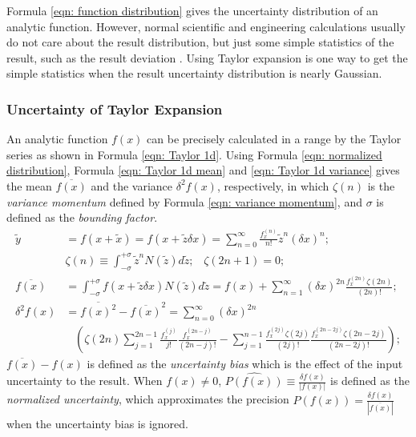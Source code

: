 \documentclass[twoside]{article}
\numberwithin{equation}{section}
\newcommand{\eqspace}{\;\;\;}
\begin{document}
\fi


Formula \eqref{eqn: function distribution} gives the uncertainty distribution of an analytic function.
However, normal scientific and engineering calculations usually do not care about the result distribution, but just some simple statistics of the result, such as the result deviation \cite{Statistical_Methods} \cite{Precisions_Physical_Measurements}.
Using Taylor expansion is one way to get the simple statistics when the result uncertainty distribution is nearly Gaussian.

\subsubsection{Uncertainty of Taylor Expansion}

An analytic function $f(x)$ can be precisely calculated in a range by the Taylor series as shown in Formula \eqref{eqn: Taylor 1d}.
Using Formula \eqref{eqn: normalized distribution}, Formula \eqref{eqn: Taylor 1d mean} and \eqref{eqn: Taylor 1d variance} \cite{Prev_Precision_Arithmetic} gives the mean $\overline{f(x)}$ and the variance $\delta^2 f(x)$, respectively, in which $\zeta(n)$ is the \emph{variance momentum} defined by Formula \eqref{eqn: variance momentum}, and $\sigma$ is defined as the \emph{bounding factor}.
\begin{align}
\label{eqn: Taylor 1d} 
\tilde{y} &= f(x + \tilde{x}) = f(x + \tilde{z} \delta x) = \sum_{n=0}^{\infty} \frac{f^{(n)}_x}{n!} \tilde{z}^n (\delta x)^n; \\
\label{eqn: variance momentum}
& \zeta(n) \equiv \int_{-\sigma}^{+\sigma} \tilde{z}^n N(\tilde{z}) d \tilde{z};\eqspace \zeta(2n+1) = 0; \\
\label{eqn: Taylor 1d mean}
\overline{f(x)} &= \int_{-\sigma}^{+\sigma} f(x + \tilde{z} \delta x) N(\tilde{z}) d \tilde{z}
  = f(x) + \sum_{n=1}^{\infty}(\delta x)^{2n} \frac{f^{(2n)}_x \zeta(2n)}{(2n)!}; \\
\label{eqn: Taylor 1d variance}
\delta^2 f(x) &= \overline{f(x)^2} - \overline{f(x)}^2 = \sum_{n=0}^{\infty} (\delta x)^{2n} \\
&\eqspace \left( \zeta(2n) \sum_{j=1}^{2n-1} \frac{f^{(j)}_x}{j!} \frac{f^{(2n-j)}_x}{(2n-j)!} - 
 	\sum_{j=1}^{n-1} \frac{f^{(2j)}_x \zeta(2j)}{(2j)!} \frac{f^{(2n-2j)}_x \zeta(2n - 2j)}{(2n-2j)!} \right);  \nonumber
\end{align}
$\overline{f(x)} - f(x)$ is defined as the \emph{uncertainty bias} which is the effect of the input uncertainty to the result.
When $f(x) \neq 0$, $\widehat{P(f(x))} \equiv \frac{\delta f(x)}{|f(x)|}$ is defined as the \emph{normalized uncertainty}, which approximates the precision $P(f(x)) =\frac{\delta f(x)}{|\overline{f(x)}|}$ when the uncertainty bias is ignored.
\end{document}
